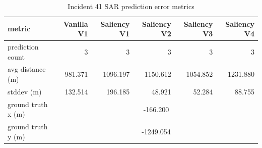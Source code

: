 \begin{table}[ht]
\centering
\caption{Incident 41 SAR prediction error metrics}
\label{tab:sar-incident-41}
\begin{tabular}{lrrrrr}
\hline
metric & Vanilla V1 & Saliency V1 & Saliency V2 & Saliency V3 & Saliency V4 \\
\hline
prediction count & 3 & 3 & 3 & 3 & 3 \\
avg distance (m) & 981.371 & 1096.197 & 1150.612 & 1054.852 & 1231.880 \\
stddev (m) & 132.514 & 196.185 & 48.921 & 52.284 & 88.755 \\
ground truth x (m) & \multicolumn{5}{c}{-166.200} \\
ground truth y (m) & \multicolumn{5}{c}{-1249.054} \\
\hline
\end{tabular}
\end{table}
